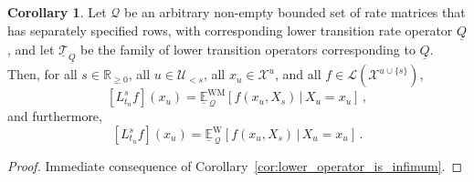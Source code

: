\documentclass[10pt]{paper}
\theoremstyle{definition}
\newtheorem{corollary}[theorem]{Corollary}
\newcommand{\reals}{\mathbb{R}}
\newcommand{\realsnonneg}{\reals_{\geq 0}}
\newcommand{\states}{\mathcal{X}}
\newcommand{\gambles}{\mathcal{L}}
\newcommand{\rateset}{\mathcal{Q}}
\newcommand{\lrate}{\underline{Q}}
\begin{document}
\begin{corollary}\label{cor:inf_works_for_single_future_var}
Let $\rateset$ be an arbitrary non-empty bounded set of rate matrices that has separately specified rows, with corresponding lower transition rate operator $\lrate$, and let $\underline{\mathcal{T}}_{\lrate}$ be the family of lower transition operators corresponding to $\lrate$. Then, for all $s\in\realsnonneg$, all $u\in\mathcal{U}_{<s}$, all $x_u\in\states^u$, and all $f\in\gambles(\states^{u\cup\{s\}})$,
\begin{equation*}
\left[L_{t_n}^s f\right](x_u) = \underline{\mathbb{E}}^{\mathrm{WM}}_{\,\rateset}[f(x_u,X_s)\,\vert\,X_u=x_u]\,,
\end{equation*}
and furthermore,
\begin{equation*}
\left[L_{t_n}^s f\right](x_u) = \underline{\mathbb{E}}^\mathrm{W}_{\,\rateset}[f(x_u,X_s)\,\vert\,X_u=x_u]\,.
\end{equation*}
\end{corollary}
\begin{proof}
Immediate consequence of Corollary~\ref{cor:lower_operator_is_infimum}.
\end{proof}
\end{document}
